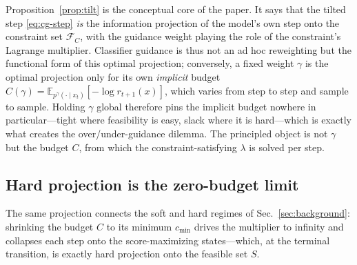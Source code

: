 \documentclass{article}
\newcommand{\E}{\mathbb{E}}
\begin{document}
Proposition~\ref{prop:tilt} is the conceptual core of the paper. It says that the tilted step \eqref{eq:cg-step} \emph{is} the information projection of the model's own step onto the constraint set $\mathcal F_C$, with the guidance weight playing the role of the constraint's Lagrange multiplier. Classifier guidance is thus not an ad hoc reweighting but the functional form of this optimal projection; conversely, a fixed weight $\gamma$ is the optimal projection only for its own \emph{implicit} budget $C(\gamma)=\E_{p^{\gamma}(\cdot\mid x_t)}[-\log r_{t+1}(x)]$, which varies from step to step and sample to sample. Holding $\gamma$ global therefore pins the implicit budget nowhere in particular---tight where feasibility is easy, slack where it is hard---which is exactly what creates the over/under-guidance dilemma. The principled object is not $\gamma$ but the budget $C$, from which the constraint-satisfying $\lambda$ is solved per step.

\subsection{Hard projection is the zero-budget limit}
The same projection connects the soft and hard regimes of Sec.~\ref{sec:background}: shrinking the budget $C$ to its minimum $c_{\min}$ drives the multiplier to infinity and collapses each step onto the score-maximizing states---which, at the terminal transition, is exactly hard projection onto the feasible set $S$.
\end{document}
